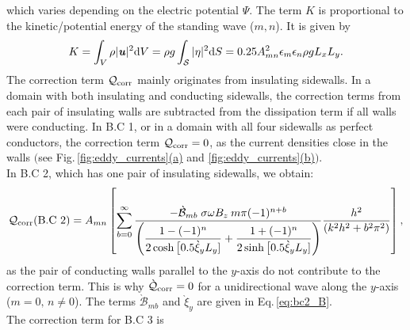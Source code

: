 \documentclass[aps,prfluids,reprint,superscriptaddress]{revtex4-2}
\newcommand{\h}[1]{\textbf{\textit{#1}}}
\newcommand{\ii}[1]{\text{#1}}
\begin{document}
which varies depending on the electric potential $\Psi$. The term $K$ is proportional to the kinetic/potential energy of the standing wave ($m,n$). It is given by
\begin{equation}
	K = \int_{V}\rho|\h u|^2\mathrm dV = \rho g\int_{\mathcal S}|\eta|^2 \mathrm dS =
	 0.25 A^2_{mn}\epsilon_{m}\epsilon_{n} \rho g L_xL_y.
	\label{eq:K_eq}
\end{equation}
The correction term $\mathcal{Q}_{\rm corr}$ mainly originates from insulating sidewalls. In a domain with both insulating and conducting sidewalls, the correction terms from each pair of insulating walls are subtracted from the dissipation term if all walls were conducting. In B.C 1, or in a domain with all four sidewalls as perfect conductors, the correction term ${\mathcal{Q}}_{\rm corr} = 0$, as the current densities close in the walls $\bigl($see Fig.\,\ref{fig:eddy_currents}\hyperref[fig:eddy_ab]{(a)} and  \ref{fig:eddy_currents}\hyperref[fig:eddy_ab]{(b)}$\bigr)$. 
\\
\indent In B.C 2, which has one pair of insulating sidewalls, we obtain:
\begin{equation}
	{\mathcal{Q}}_{\rm corr} (\ii{B.C 2}) = 
	A_{mn}  \left[
	\sum_{b=0}^{\infty} 
	\frac{
		-\grave{\mathcal B}_{mb} \; \sigma\omega B_z \:
		 m\pi (-1)^{n+b} 	}
	{
		\left(
		\dfrac{1-(-1)^n}{2\cosh{\bigl[0.5\grave\xi_y L_y]}} + \dfrac{1+(-1)^n}{2\sinh{\bigl[0.5\grave\xi_y L_y]}}
		\right)
	}
	\frac{h^2}{(k^2h^2 +  b^2\pi^2)}
	\right] ,
	\label{eq:qcorr_bc2}
\end{equation}
as the pair of conducting walls parallel to the $y$-axis do not contribute to the correction term. This is why $\grave{\mathcal{Q}}_{\rm corr} = 0$ for a unidirectional wave along the $y$-axis ($m=0,\,n\neq0$). The terms $\grave{\mathcal B}_{mb}$ and $\grave\xi_y$ are given in Eq.\,\eqref{eq:bc2_B}.
\\
\indent The correction term for B.C 3 is
\end{document}
